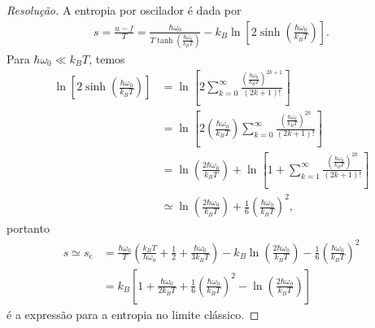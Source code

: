 \begin{proof}[Resolução]
    A entropia por oscilador é dada por
    \begin{align*}
        s = \frac{u - f}{T} = \frac{\hbar \omega_0}{T\tanh\left(\frac{\hbar\omega_0}{k_BT}\right)} - k_B \ln\left[2\sinh\left(\frac{\hbar \omega_0}{k_B T}\right)\right].
    \end{align*}
    Para \(\hbar \omega_0 \ll k_B T\), temos
    \begin{align*}
        \ln\left[2\sinh\left(\frac{\hbar \omega_0}{k_B T}\right)\right] &= \ln\left[2 \sum_{k=0}^\infty \frac{\left(\frac{\hbar\omega_0}{k_BT}\right)^{2k+1}}{(2k+1)!}\right]\\
                                                                        &= \ln\left[2\left(\frac{\hbar\omega_0}{k_BT}\right)\sum_{k=0}^\infty \frac{\left(\frac{\hbar\omega_0}{k_BT}\right)^{2k}}{(2k+1)!}\right]\\
                                                                        &= \ln\left(\frac{2\hbar\omega_0}{k_BT}\right) + \ln\left[1 + \sum_{k=1}^\infty\frac{\left(\frac{\hbar\omega_0}{k_BT}\right)^{2k}}{(2k+1)!}\right]\\
                                                                        &\simeq \ln\left(\frac{2\hbar\omega_0}{k_BT}\right) + \frac16\left(\frac{\hbar\omega_0}{k_BT}\right)^2,
    \end{align*}
    portanto
    \begin{align*}
        s \simeq s_\mathrm{c} &= \frac{\hbar \omega_0}{T} \left(\frac{k_B T}{\hbar\omega_0} + \frac{1}{2} + \frac{\hbar \omega_0}{3 k_B T}\right) - k_B\ln\left(\frac{2\hbar\omega_0}{k_BT}\right) - \frac16\left(\frac{\hbar\omega_0}{k_BT}\right)^2\\
                              &= k_B \left[1 + \frac{\hbar\omega_0}{2k_B T} + \frac16\left(\frac{\hbar \omega_0}{k_B T}\right)^2 - \ln\left(\frac{2\hbar \omega_0}{k_B T}\right)\right]
    \end{align*}
    é a expressão para a entropia no limite clássico.


\end{proof}
